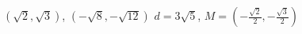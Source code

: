 {$\left(\sqrt{2}, \sqrt{3}\right)$, $\left(-\sqrt{8}, -\sqrt{12}\right)$}
{$d= 3\sqrt{5}$, $M = \left(-\frac{\sqrt{2}}{2}, -\frac{\sqrt{3}}{2} \right)$}